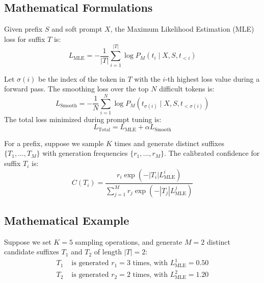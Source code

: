 \documentclass{article}
\begin{document}
\subsection{Mathematical Formulations}
Given prefix $S$ and soft prompt $X$, the Maximum Likelihood Estimation (MLE) loss for suffix $T$ is:
\begin{equation}
    L_{\text{MLE}} = -\frac{1}{|T|} \sum_{i=1}^{|T|} \log P_M(t_i \mid X, S, t_{<i})
\end{equation}

Let $\sigma(i)$ be the index of the token in $T$ with the $i$-th highest loss value during a forward pass. The smoothing loss over the top $N$ difficult tokens is:
\begin{equation}
    L_{\text{Smooth}} = -\frac{1}{N} \sum_{i=1}^N \log P_M(t_{\sigma(i)} \mid X, S, t_{<\sigma(i)})
\end{equation}
The total loss minimized during prompt tuning is:
\begin{equation}
    L_{\text{Total}} = L_{\text{MLE}} + \alpha L_{\text{Smooth}}
\end{equation}

For a prefix, suppose we sample $K$ times and generate distinct suffixes $\{T_1, \dots, T_M\}$ with generation frequencies $\{r_1, \dots, r_M\}$. The calibrated confidence for suffix $T_i$ is:
\begin{equation}
    C(T_i) = \frac{r_i \exp(-|T_i| L^i_{\text{MLE}})}{\sum_{j=1}^M r_j \exp(-|T_j| L^j_{\text{MLE}})}
\end{equation}

\subsection{Mathematical Example}
Suppose we set $K=5$ sampling operations, and generate $M=2$ distinct candidate suffixes $T_1$ and $T_2$ of length $|T| = 2$:
\begin{align*}
    T_1 & \text{ is generated } r_1 = 3 \text{ times, with } L^1_{\text{MLE}} = 0.50 \\
    T_2 & \text{ is generated } r_2 = 2 \text{ times, with } L^2_{\text{MLE}} = 1.20
\end{align*}
\end{document}
